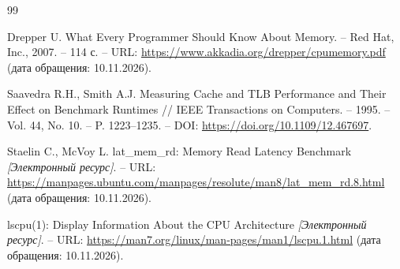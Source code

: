 \begin{thebibliography}{99}

Drepper U. 
What Every Programmer Should Know About Memory. 
– Red Hat, Inc., 2007. – 114 с. 
– URL: \url{https://www.akkadia.org/drepper/cpumemory.pdf}
(дата обращения: 10.11.2026).

Saavedra R.H., Smith A.J. 
Measuring Cache and TLB Performance and Their Effect on Benchmark Runtimes // 
IEEE Transactions on Computers. – 1995. – Vol. 44, No. 10. – P. 1223–1235. 
– DOI: \url{https://doi.org/10.1109/12.467697}.

Staelin C., McVoy L. 
lat\_mem\_rd: Memory Read Latency Benchmark 
\textit{[Электронный ресурс]}. 
– URL: \url{https://manpages.ubuntu.com/manpages/resolute/man8/lat_mem_rd.8.html}
(дата обращения: 10.11.2026).

lscpu(1): Display Information About the CPU Architecture 
\textit{[Электронный ресурс]}. 
– URL: \url{https://man7.org/linux/man-pages/man1/lscpu.1.html}
(дата обращения: 10.11.2026).

\end{thebibliography}